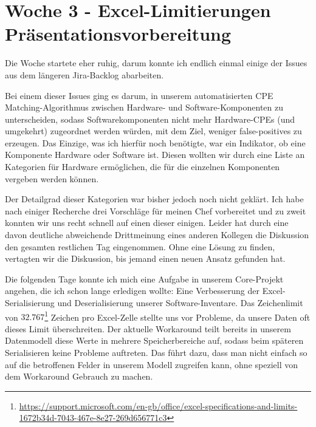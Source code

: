 \section{Woche 3 - Excel-Limitierungen \headerand Präsentationsvorbereitung} \label{sec:bericht-wo-3-initial}


\lweekdaymarginpar{\weekdayMondayLong}

Die Woche startete eher ruhig, darum konnte ich endlich einmal einige der Issues aus dem längeren Jira-Backlog abarbeiten.

Bei einem dieser Issues ging es darum, in unserem automatisierten CPE Matching-Algorithmus zwischen Hardware- und Software-Komponenten zu unterscheiden, sodass Softwarekomponenten nicht mehr Hardware-CPEs (und umgekehrt) zugeordnet werden würden, mit dem Ziel, weniger false-positives zu erzeugen.
Das Einzige, was ich hierfür noch benötigte, war ein Indikator, ob eine Komponente Hardware oder Software ist.
Diesen wollten wir durch eine Liste an Kategorien für Hardware ermöglichen, die für die einzelnen Komponenten vergeben werden können.

Der Detailgrad dieser Kategorien war bisher jedoch noch nicht geklärt.
Ich habe nach einiger Recherche drei Vorschläge für meinen Chef vorbereitet und zu zweit konnten wir uns recht schnell auf einen dieser einigen.
Leider hat durch eine davon deutliche abweichende Drittmeinung eines anderen Kollegen die Diskussion den gesamten restlichen Tag eingenommen.
Ohne eine Lösung zu finden, vertagten wir die Diskussion, bis jemand einen neuen Ansatz gefunden hat.

\sweekdaymarginpar{\weekdayTuesdayShort\ - \weekdayThursdayShort}

Die folgenden Tage konnte ich mich eine Aufgabe in unserem Core-Projekt angehen, die ich schon lange erledigen wollte:
Eine Verbesserung der Excel-Serialisierung und Deserialisierung unserer Software-Inventare.
Das Zeichenlimit von $32.767$\footnote{\url{https://support.microsoft.com/en-gb/office/excel-specifications-and-limits-1672b34d-7043-467e-8e27-269d656771c3}} Zeichen pro Excel-Zelle stellte uns vor Probleme, da unsere Daten oft dieses Limit überschreiten.
Der aktuelle Workaround teilt bereits in unserem Datenmodell diese Werte in mehrere Speicherbereiche auf, sodass beim späteren Serialisieren keine Probleme auftreten.
Das führt dazu, dass man nicht einfach so auf die betroffenen Felder in unserem Modell zugreifen kann, ohne speziell von dem Workaround Gebrauch zu machen.

